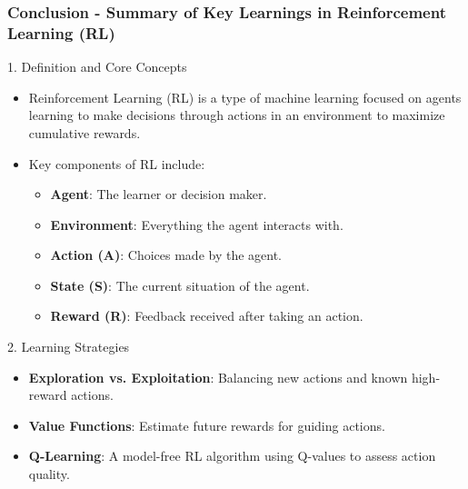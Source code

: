 \documentclass[aspectratio=169]{beamer}
\begin{document}
\begin{frame}[fragile]
    \frametitle{Conclusion - Summary of Key Learnings in Reinforcement Learning (RL)}
    
    \begin{block}{1. Definition and Core Concepts}
        \begin{itemize}
            \item Reinforcement Learning (RL) is a type of machine learning focused on agents learning to make decisions through actions in an environment to maximize cumulative rewards.
            \item Key components of RL include:
            \begin{itemize}
                \item \textbf{Agent}: The learner or decision maker.
                \item \textbf{Environment}: Everything the agent interacts with.
                \item \textbf{Action (A)}: Choices made by the agent.
                \item \textbf{State (S)}: The current situation of the agent.
                \item \textbf{Reward (R)}: Feedback received after taking an action.
            \end{itemize}
        \end{itemize}
    \end{block}
    
    \begin{block}{2. Learning Strategies}
        \begin{itemize}
            \item \textbf{Exploration vs. Exploitation}: Balancing new actions and known high-reward actions.
            \item \textbf{Value Functions}: Estimate future rewards for guiding actions.
            \item \textbf{Q-Learning}: A model-free RL algorithm using Q-values to assess action quality.
        \end{itemize}
    \end{block}
    
\end{frame}
\end{document}
